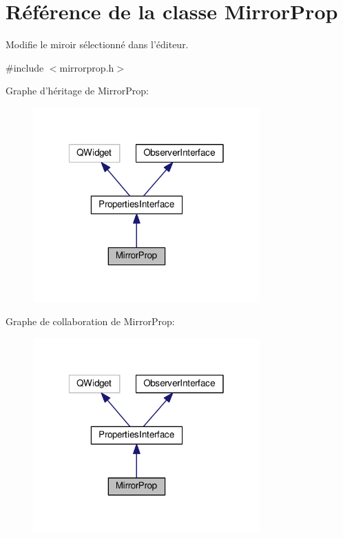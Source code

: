 \hypertarget{classMirrorProp}{\section{Référence de la classe Mirror\+Prop}
\label{classMirrorProp}
}


Modifie le miroir sélectionné dans l’éditeur.  




{\ttfamily \#include $<$mirrorprop.\+h$>$}



Graphe d'héritage de Mirror\+Prop\+:\nopagebreak
\begin{figure}[H]
\begin{center}
\leavevmode
\includegraphics[width=247pt]{dc/d36/classMirrorProp__inherit__graph}
\end{center}
\end{figure}


Graphe de collaboration de Mirror\+Prop\+:\nopagebreak
\begin{figure}[H]
\begin{center}
\leavevmode
\includegraphics[width=247pt]{d3/d3c/classMirrorProp__coll__graph}
\end{center}
\end{figure}
